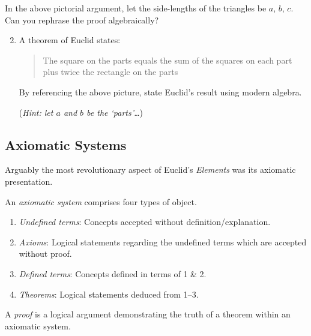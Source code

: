 \begin{exercises}{}{}
	\exstart In the above pictorial argument, let the side-lengths of the triangles be $a$, $b$, $c$. Can you rephrase the proof algebraically?
	\begin{enumerate}\setcounter{enumi}{1}
		\item A theorem of Euclid states:
		\begin{quote}
			The square on the parts equals the sum of the squares on each part plus twice the rectangle on the parts
		\end{quote}
		By referencing the above picture, state Euclid's result using modern algebra.\par
		(\emph{Hint: let $a$ and $b$ be the `parts'\ldots})
	\end{enumerate}
\end{exercises}



\clearpage



\subsection{Axiomatic Systems}

Arguably the most revolutionary aspect of Euclid's \emph{Elements} was its axiomatic presentation.

\begin{defn}{}{}
	An \emph{axiomatic system} comprises four types of object.\vspace{-4pt}
	\begin{enumerate}\itemsep0pt
	  \item \emph{Undefined terms}: Concepts accepted without definition/explanation.
	  \item \emph{Axioms}: Logical statements regarding the undefined terms which are accepted without proof.
	  \item \emph{Defined terms}: Concepts defined in terms of 1 \& 2.
	  \item \emph{Theorems}: Logical statements deduced from 1--3.
	\end{enumerate}
	A \emph{proof} is a logical argument demonstrating the truth of a theorem within an axiomatic system.
\end{defn}

